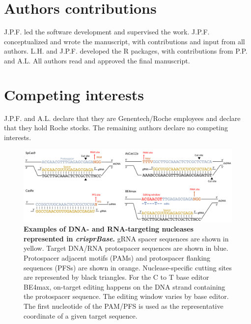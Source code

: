 \documentclass[pdftex,english,10pt]{article}
\begin{document}
{%
\section*{Authors contributions}

J.P.F. led the software development and supervised the work.
J.P.F. conceptualized and wrote the manuscript, with contributions and input from all authors. 
L.H. and J.P.F. developed the R packages, with contributions from P.P. and A.L.
All authors read and approved the final manuscript.

\section*{Competing interests}

J.P.F. and A.L. declare that they are Genentech/Roche employees and declare that they hold Roche stocks. 
The remaining authors declare no competing interests.


\clearpage

\begin{figure}[!h]
\centering
\includegraphics[width=1\textwidth]{Figure1.pdf}
  \caption{\textbf{Examples of DNA- and RNA-targeting nucleases represented in \textit{crisprBase}.} gRNA spacer sequences are shown in yellow. Target DNA/RNA protospacer sequences are shown in blue. Protospacer adjacent motifs (PAMs) and protospacer flanking sequences (PFSs) are shown in orange. Nuclease-specific cutting sites are represented by black triangles. For the C to T base editor BE4max, on-target editing happens on the DNA strand containing the protospacer sequence. The editing window varies by base editor. The first nucleotide of the PAM/PFS is used as the representative coordinate of a given target sequence. 
  }
  \label{fig:nucleases}
\end{figure}



}
\end{document}
